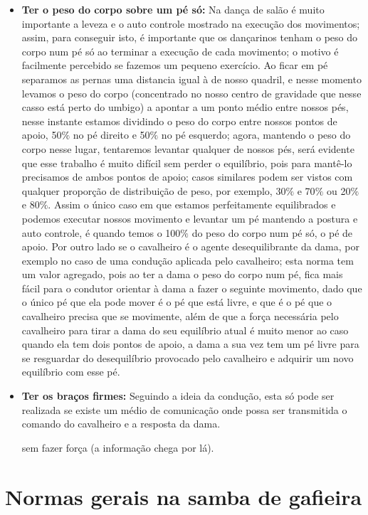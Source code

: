 \begin{itemize}
\item \textbf{Ter o peso do corpo sobre um pé só:} 
Na dança de salão é muito importante a leveza e o auto controle mostrado na 
execução dos movimentos; assim, para conseguir isto, é importante que os dançarinos
tenham o peso do corpo num pé só ao terminar a execução de cada movimento; o motivo
é facilmente percebido se fazemos um pequeno exercício. Ao ficar em pé separamos as
pernas uma distancia igual à de nosso quadril, e nesse momento levamos o peso do corpo
(concentrado no nosso centro de gravidade que nesse casso está perto do umbigo) a
apontar a um ponto médio entre nossos pés, nesse instante estamos dividindo o peso do corpo
entre nossos pontos de apoio, 50$\%$ no pé direito e 50$\%$ no pé esquerdo; agora, mantendo o peso
do corpo nesse lugar, tentaremos levantar qualquer de nossos pés, será evidente
que esse trabalho é muito difícil sem perder o equilíbrio, pois para mantê-lo
precisamos de ambos pontos de apoio; casos similares podem ser vistos com qualquer proporção de distribuição de peso,
por exemplo, 30$\%$ e 70$\%$ ou 20$\%$ e 80$\%$. Assim o único caso em que estamos
perfeitamente equilibrados e podemos executar nossos movimento e levantar um pé 
mantendo a postura e auto controle, é quando
temos o 100$\%$ do peso do corpo num pé só, o pé de apoio. 
Por outro lado se o cavalheiro é  o agente desequilibrante da dama, por exemplo no caso
de uma condução aplicada pelo cavalheiro;
esta norma tem um valor agregado, pois ao ter a dama o peso do corpo num pé, 
fica mais fácil para o condutor orientar
à dama a fazer o seguinte movimento, dado que o único pé que ela pode mover é o pé
que está livre, e que é o pé que o cavalheiro precisa que se movimente, 
além de que a força necessária pelo cavalheiro para tirar a dama do seu equilíbrio 
atual é muito menor ao caso quando ela tem dois pontos de apoio, a dama 
a sua vez tem um pé livre para se resguardar do desequilíbrio provocado pelo 
cavalheiro e adquirir um novo equilíbrio com esse pé.

\item \textbf{Ter os braços firmes:} Seguindo a ideia da condução, esta só pode
ser realizada se existe um médio de comunicação onde possa ser transmitida
o comando do cavalheiro e a resposta da dama.

sem fazer força (a informação chega por lá).
\end{itemize}

\section{Normas gerais na samba de gafieira}


